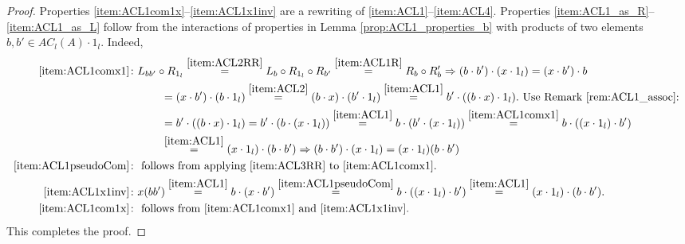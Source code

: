 \documentclass[12pt]{article}
\begin{document}
		\begin{proof}
			Properties \ref{item:ACL1com1x}--\ref{item:ACL1x1inv} are a rewriting of \ref{item:ACL1}--\ref{item:ACL4}. Properties \ref{item:ACL1_as_R}--\ref{item:ACL1_as_L} follow from the interactions of properties in Lemma \ref{prop:ACL1_properties_b} with products of two elements $b,b'\in AC_l(A)\cdot 1_l$. Indeed,
			\begin{align*}
				\ref{item:ACL1comx1}&\colon L_{bb'}\circ R_{1_l}\overset{\ref{item:ACL2RR}}{=} L_b\circ R_{1_l}\circ R_{b'}\overset{\ref{item:ACL1R}}{=} R_b\circ R_b'\Rightarrow (b\cdot b')\cdot (x\cdot 1_l)=(x\cdot b')\cdot b\\
				&\hspace{1cm}=(x\cdot b')\cdot (b\cdot 1_l)\overset{\ref{item:ACL2}}{=}(b\cdot x)\cdot (b'\cdot 1_l)\overset{\ref{item:ACL1}}{=}b'\cdot ((b\cdot x)\cdot 1_l).\textnormal{ Use Remark \ref{rem:ACL1_assoc}: }\\
				&\hspace{1cm}=b'\cdot ((b\cdot x)\cdot 1_l)=b'\cdot (b\cdot (x\cdot 1_l))\overset{\ref{item:ACL1}}{=}b\cdot (b'\cdot (x\cdot 1_l))\overset{\ref{item:ACL1comx1}}{=}b\cdot ((x\cdot 1_l)\cdot b')\\
				&\hspace{1cm}\overset{\ref{item:ACL1}}{=}(x\cdot 1_l)\cdot (b\cdot b')\Rightarrow (b\cdot b')\cdot (x\cdot 1_l)=(x\cdot 1_l)(b\cdot b')\\
				\ref{item:ACL1pseudoCom}&\colon \textnormal{ follows from applying }\ref{item:ACL3RR}\textnormal{ to }\ref{item:ACL1comx1}.\\
				\ref{item:ACL1x1inv}&\colon x(bb')\overset{\ref{item:ACL1}}{=}b\cdot (x\cdot b')\overset{\ref{item:ACL1pseudoCom}}{=}b\cdot ((x\cdot 1_l)\cdot b')\overset{\ref{item:ACL1}}{=}(x\cdot 1_l)\cdot (b\cdot b').\\
				\ref{item:ACL1com1x}&\colon \textnormal{ follows from }\ref{item:ACL1comx1} \textnormal{ and }\ref{item:ACL1x1inv}.
			\end{align*}
			This completes the proof.
		\end{proof}
		
\end{document}

